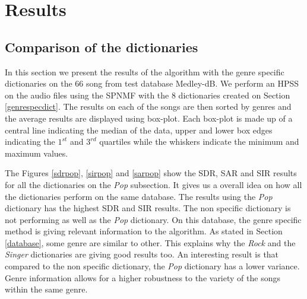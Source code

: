 \documentclass{article}
\begin{document}
\section{Results}


\subsection{Comparison of the dictionaries}

In this section we present the results of the algorithm with the genre specific dictionaries on the $66$ song from test database Medley-dB. We perform an HPSS on the audio files using the SPNMF with the $8$ dictionaries created on Section \ref{genrespecdict}. The results on each of the songs are then sorted by genres and the average results are displayed using box-plot. Each box-plot is made up of a central line indicating the median of the data, upper and lower box edges indicating the $1^{st}$ and $3^{rd}$ quartiles while the whiskers indicate the minimum and maximum values. 


The Figures \ref{sdrpop}, \ref{sirpop} and \ref{sarpop} show the SDR, SAR and SIR results for all the dictionaries on the \emph{Pop} subsection. It gives us a overall idea on how all the dictionaries perform on the same database. The results using the \emph{Pop} dictionary has the highest SDR and SIR results. The non specific dictionary is not performing as well as the \emph{Pop} dictionary. On this database, the genre specific method is giving relevant information to the algorithm. As stated in Section \ref{database}, some genre are similar to other. This explains why the \emph{Rock} and the \emph{Singer} dictionaries are giving good results too. 
An interesting result is that compared to the non specific dictionary, the \emph{Pop} dictionary has a lower variance. Genre information allows for a higher robustness to the variety of the songs within the same genre.  
\end{document}
